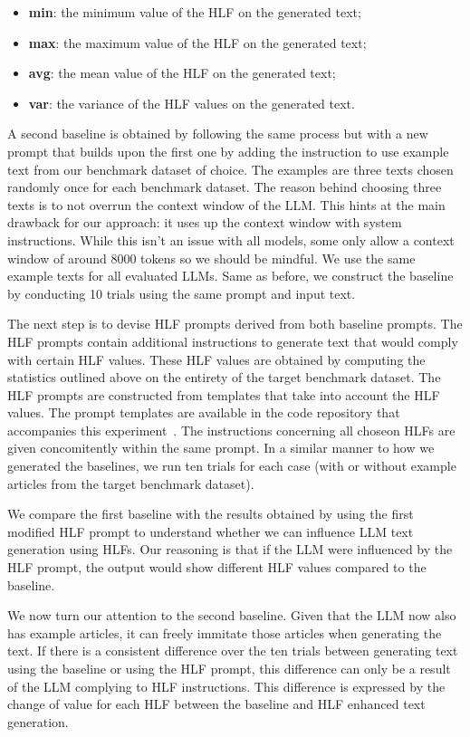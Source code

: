 \documentclass[runningheads,a4paper,11pt]{article}
\begin{document}
\begin{itemize}
    \item \textbf{min}: the minimum value of the HLF on the generated text;
    \item \textbf{max}: the maximum value of the HLF on the generated text;
    \item \textbf{avg}: the mean value of the HLF on the generated text;
    \item \textbf{var}: the variance of the HLF values on the generated text.
\end{itemize}

A second baseline is obtained by following the same process but with a new
prompt that builds upon the first one by adding the instruction to use example
text from our benchmark dataset of choice.
The examples are three texts chosen randomly once for each benchmark dataset.
The reason behind choosing three texts is to not overrun the context window of
the LLM.
This hints at the main drawback for our approach: it uses up the context window
with system instructions.
While this isn't an issue with all models, some only allow a context window of
around 8000 tokens so we should be mindful.
We use the same example texts for all evaluated LLMs.
Same as before, we construct the baseline by conducting 10 trials using the same
prompt and input text.

The next step is to devise HLF prompts derived from both baseline prompts.
The HLF prompts contain additional instructions to generate text that would
comply with certain HLF values.
These HLF values are obtained by computing the statistics outlined above on
the entirety of the target benchmark dataset.
The HLF prompts are constructed from templates that take into account the HLF
values.
The prompt templates are available in the code repository that accompanies this
experiment~\cite{olar2024experimentcode}.
The instructions concerning all choseon HLFs are given concomitently within the
same prompt.
In a similar manner to how we generated the baselines, we run ten trials for
each case (with or without example articles from the target benchmark dataset).

We compare the first baseline with the results obtained by using the first
modified HLF prompt to understand whether we can influence LLM text generation
using HLFs.
Our reasoning is that if the LLM were influenced by the HLF prompt, the output
would show different HLF values compared to the baseline.

We now turn our attention to the second baseline.
Given that the LLM now also has example articles, it can freely immitate those
articles when generating the text.
If there is a consistent difference over the ten trials between generating text
using the baseline or using the HLF prompt, this difference can only be a result
of the LLM complying to HLF instructions.
This difference is expressed by the change of value for each HLF between the
baseline and HLF enhanced text generation.
\end{document}
